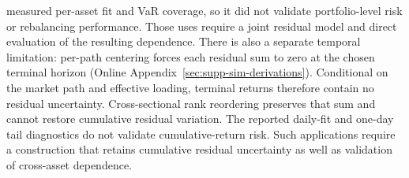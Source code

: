 measured per-asset fit and VaR coverage, so it did not validate
portfolio-level risk or rebalancing performance. Those uses require a
joint residual model and direct evaluation of the resulting dependence.
There is also a separate temporal limitation: per-path centering
forces each residual sum to zero at the chosen terminal horizon
(Online Appendix~\ref{sec:supp-sim-derivations}). Conditional on the
market path and effective loading, terminal returns therefore contain
no residual uncertainty. Cross-sectional rank reordering preserves
that sum and cannot restore cumulative residual variation. The
reported daily-fit and one-day tail diagnostics do not validate
cumulative-return risk. Such applications require a construction that
retains cumulative residual uncertainty as well as validation of
cross-asset dependence.
